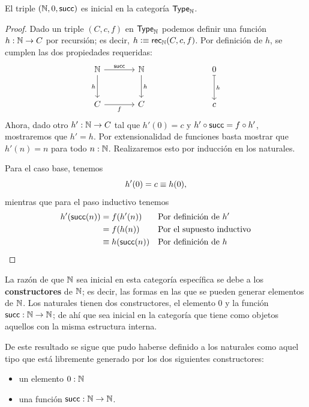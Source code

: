 \documentclass[../main.tex]{subfiles}
\begin{document}
\begin{theorem}
  El triple $(\mathbb{N}, 0 , \mathsf{succ})$ es inicial en la categor\'ia $\mathsf{Type}_\mathbb{N}$.
\end{theorem}
\begin{proof}
  Dado un triple $(C,c,f)$ en $\mathsf{Type}_\mathbb{N}$ podemos definir una funci\'on $h : \mathbb{N} \to C$ por recursi\'on; es decir, $h \vcentcolon\equiv \mathsf{rec}_{\mathbb{N}}(C,c,f)$. Por definici\'on de $h$, se cumplen las dos propiedades requeridas:
  \[\begin{tikzcd}[row sep=large,column sep=large]
      \N & \N && 0 \\
      C & C && c
      \arrow["\suc", from=1-1, to=1-2]
      \arrow["h"', from=1-1, to=2-1]
      \arrow["h", from=1-2, to=2-2]
      \arrow["f"', from=2-1, to=2-2]
      \arrow["h", maps to, from=1-4, to=2-4]
    \end{tikzcd}\]
  Ahora, dado otro $h': \mathbb{N} \to C$ tal que $h'(0)=c$ y $h' \circ \mathsf{succ} = f \circ h'$, mostraremos que $h'=h$. Por extensionalidad de funciones basta mostrar que $h'(n)=n$ para todo $n:\mathbb{N}$. Realizaremos esto por inducci\'on en los naturales.

  Para el caso base, tenemos
  \[ h'(0) = c \equiv h(0), \]
  mientras que para el paso inductivo tenemos
  \begin{align*}
    h'(\mathsf{succ}(n)) & = f (h'(n))       &  & \text{Por definici\'on de $h'$}  \\
                & = f (h(n))        &  & \text{Por el supuesto inductivo} \\
                & \equiv h (\mathsf{succ}(n)) &  & \text{Por definici\'on de $h$}
  \end{align*}
\end{proof}

La raz\'on de que $\mathbb{N}$ sea inicial en esta categor\'ia espec\'ifica se debe a los \textbf{constructores} de $\mathbb{N}$; es decir, las formas en las que se pueden generar elementos de $\mathbb{N}$.
Los naturales tienen dos constructores, el elemento $0$ y la funci\'on $\mathsf{succ}:\mathbb{N} \to \mathbb{N}$; de ah\'i que sea inicial en la categor\'ia que tiene como objetos aquellos con la misma estructura interna.

De este resultado se sigue que pudo haberse definido a los naturales como aquel tipo que est\'a libremente generado por los dos siguientes constructores:
\begin{itemize}
  \item un elemento $0 :\mathbb{N}$
  \item una funci\'on $\mathsf{succ} : \mathbb{N} \to \mathbb{N}$.
\end{itemize}
\end{document}
